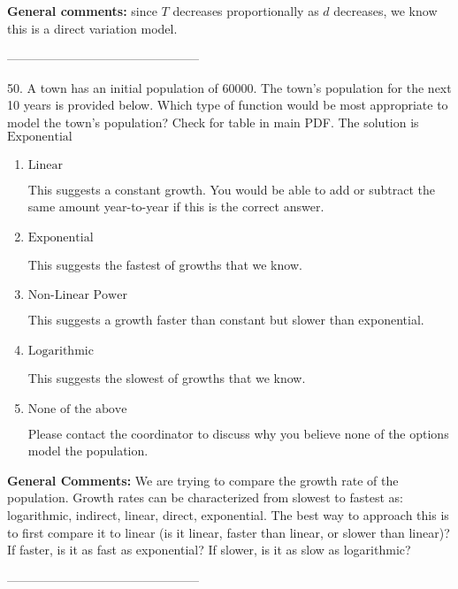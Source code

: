 \documentclass{extbook}[14pt]
\begin{document}
\textbf{General comments:} since $T$ decreases proportionally as $d$ decreases, we know this is a direct variation model.

-----------------------------------------------

50. A town has an initial population of 60000. The town's population for the next 10 years is provided below. Which type of function would be most appropriate to model the town's population?
Check for table in main PDF. 
The solution is $ \text{Exponential} $ 

\begin{enumerate}[label=\Alph*.] 
\item $ \text{Linear} $ 

 This suggests a constant growth. You would be able to add or subtract the same amount year-to-year if this is the correct answer. 
\item $ \text{Exponential} $ 

 This suggests the fastest of growths that we know. 
\item $ \text{Non-Linear Power} $ 

 This suggests a growth faster than constant but slower than exponential. 
\item $ \text{Logarithmic} $ 

 This suggests the slowest of growths that we know. 
\item $ \text{None of the above} $ 

 Please contact the coordinator to discuss why you believe none of the options model the population. 
\end{enumerate} 
 
\textbf{General Comments:} We are trying to compare the growth rate of the population. Growth rates can be characterized from slowest to fastest as: logarithmic, indirect, linear, direct, exponential. The best way to approach this is to first compare it to linear (is it linear, faster than linear, or slower than linear)? If faster, is it as fast as exponential? If slower, is it as slow as logarithmic?

-----------------------------------------------
\end{document}
